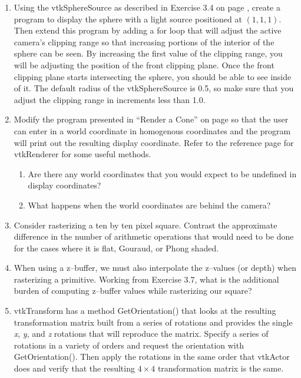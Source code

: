 \begin{enumerate}
\item Using the vtkSphereSource as described in Exercise 3.4 on page \pageref{exercise:3.4}, create a program to display the sphere with a light source positioned at $(1,1,1)$. Then extend this program by adding a for loop that will adjust the active camera's clipping range so that increasing portions of the interior of the sphere can be seen.
By increasing the first value of the clipping range, you will be adjusting the position of the front clipping plane.
Once the front clipping plane starts intersecting the sphere, you should be able to see inside of it.
The default radius of the vtkSphereSource is 0.5, so make sure that you adjust the clipping range in increments less than 1.0.

\item {}Modify the program presented in ``Render a Cone'' on page \pageref{eg:render_cone} so that the user can enter in a world coordinate in homogenous coordinates and the program will print out the resulting display coordinate. Refer to the reference page for vtkRenderer for some useful methods.

\begin{enumerate}

    \item Are there any world coordinates that you would expect to be undefined in display coordinates?

    \item What happens when the world coordinates are behind the camera?

\end{enumerate}

\item Consider rasterizing a ten by ten pixel square. Contrast the approximate difference in the number of arithmetic operations that would need to be done for the cases where it is flat, Gouraud, or Phong shaded.

\item When using a z--buffer, we must also interpolate the z--values (or depth) when rasterizing a primitive. Working from Exercise 3.7, what is the additional burden of computing z--buffer values while rasterizing our square?

\item vtkTransform has a method GetOrientation() that looks at the resulting transformation matrix built from a series of rotations and provides the single \emph{x}, \emph{y}, and \emph{z} rotations that will reproduce the matrix. Specify a series of rotations in a variety of orders and request the orientation with GetOrientation(). Then apply the rotations in the same order that vtkActor does and verify that the resulting $4 \times 4$ transformation matrix is the same.


\end{enumerate}
